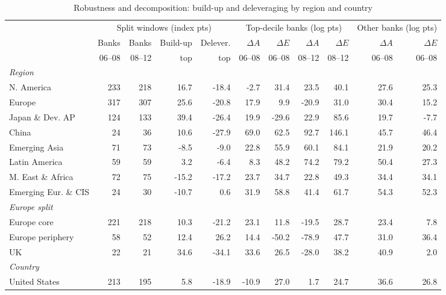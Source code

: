 \begin{table}[htbp]
\centering
\footnotesize
\begin{threeparttable}
\caption{Robustness and decomposition: build-up and deleveraging by region and country}
\label{tab:region_gfc_decomp}
\setlength{\tabcolsep}{4pt}
\begin{tabular}{lrrrrrrrrrr}
\toprule
 & \multicolumn{4}{c}{Split windows (index pts)} & \multicolumn{4}{c}{Top-decile banks (log pts)} & \multicolumn{2}{c}{Other banks (log pts)} \\
\cmidrule(lr){2-5}\cmidrule(lr){6-9}\cmidrule(lr){10-11}
 & Banks & Banks & Build-up & Delever. & $\Delta A$ & $\Delta E$ & $\Delta A$ & $\Delta E$ & $\Delta A$ & $\Delta E$ \\
 & 06--08 & 08--12 & top & top & 06--08 & 06--08 & 08--12 & 08--12 & 06--08 & 06--08 \\
\midrule
\multicolumn{11}{l}{\textit{Region}} \\
N. America & 233 & 218 & 16.7 & -18.4 & -2.7 & 31.4 & 23.5 & 40.1 & 27.6 & 25.3 \\
Europe & 317 & 307 & 25.6 & -20.8 & 17.9 & 9.9 & -20.9 & 31.0 & 30.4 & 15.2 \\
Japan \& Dev. AP & 124 & 133 & 39.4 & -26.4 & 19.9 & -29.6 & 22.9 & 85.6 & 19.7 & -7.7 \\
China & 24 & 36 & 10.6 & -27.9 & 69.0 & 62.5 & 92.7 & 146.1 & 45.7 & 46.4 \\
Emerging Asia & 71 & 73 & -8.5 & -9.0 & 22.8 & 55.9 & 60.1 & 84.1 & 21.9 & 20.2 \\
Latin America & 59 & 59 & 3.2 & -6.4 & 8.3 & 48.2 & 74.2 & 79.2 & 50.4 & 27.3 \\
M. East \& Africa & 72 & 75 & -15.2 & -17.2 & 23.7 & 34.7 & 22.8 & 49.3 & 34.4 & 34.1 \\
Emerging Eur. \& CIS & 24 & 30 & -10.7 & 0.6 & 31.9 & 58.8 & 41.4 & 61.7 & 54.3 & 52.3 \\
\multicolumn{11}{l}{\textit{Europe split}} \\
Europe core & 221 & 218 & 10.3 & -21.2 & 23.1 & 11.8 & -19.5 & 28.7 & 23.4 & 7.8 \\
Europe periphery & 58 & 52 & 12.4 & 26.2 & 14.4 & -50.2 & -78.9 & 47.7 & 31.0 & 36.4 \\
UK & 22 & 21 & 34.6 & -34.1 & 33.6 & 26.5 & -28.0 & 38.2 & 40.9 & 2.0 \\
\multicolumn{11}{l}{\textit{Country}} \\
United States & 213 & 195 & 5.8 & -18.9 & -10.9 & 27.0 & 1.7 & 24.7 & 36.6 & 26.8 \\

\end{tabular}
\end{threeparttable}
\end{table}

